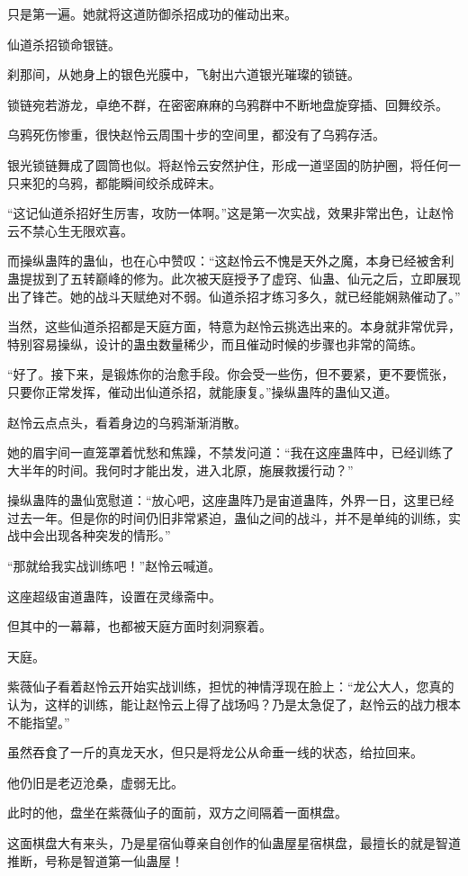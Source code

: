 \begin{this_body}
只是第一遍。她就将这道防御杀招成功的催动出来。

仙道杀招锁命银链。

刹那间，从她身上的银色光膜中，飞射出六道银光璀璨的锁链。

锁链宛若游龙，卓绝不群，在密密麻麻的乌鸦群中不断地盘旋穿插、回舞绞杀。

乌鸦死伤惨重，很快赵怜云周围十步的空间里，都没有了乌鸦存活。

银光锁链舞成了圆筒也似。将赵怜云安然护住，形成一道坚固的防护圈，将任何一只来犯的乌鸦，都能瞬间绞杀成碎末。

“这记仙道杀招好生厉害，攻防一体啊。”这是第一次实战，效果非常出色，让赵怜云不禁心生无限欢喜。

而操纵蛊阵的蛊仙，也在心中赞叹：“这赵怜云不愧是天外之魔，本身已经被舍利蛊提拔到了五转巅峰的修为。此次被天庭授予了虚窍、仙蛊、仙元之后，立即展现出了锋芒。她的战斗天赋绝对不弱。仙道杀招才练习多久，就已经能娴熟催动了。”

当然，这些仙道杀招都是天庭方面，特意为赵怜云挑选出来的。本身就非常优异，特别容易操纵，设计的蛊虫数量稀少，而且催动时候的步骤也非常的简练。

“好了。接下来，是锻炼你的治愈手段。你会受一些伤，但不要紧，更不要慌张，只要你正常发挥，催动出仙道杀招，就能康复。”操纵蛊阵的蛊仙又道。

赵怜云点点头，看着身边的乌鸦渐渐消散。

她的眉宇间一直笼罩着忧愁和焦躁，不禁发问道：“我在这座蛊阵中，已经训练了大半年的时间。我何时才能出发，进入北原，施展救援行动？”

操纵蛊阵的蛊仙宽慰道：“放心吧，这座蛊阵乃是宙道蛊阵，外界一日，这里已经过去一年。但是你的时间仍旧非常紧迫，蛊仙之间的战斗，并不是单纯的训练，实战中会出现各种突发的情形。”

“那就给我实战训练吧！”赵怜云喊道。

这座超级宙道蛊阵，设置在灵缘斋中。

但其中的一幕幕，也都被天庭方面时刻洞察着。

天庭。

紫薇仙子看着赵怜云开始实战训练，担忧的神情浮现在脸上：“龙公大人，您真的认为，这样的训练，能让赵怜云上得了战场吗？乃是太急促了，赵怜云的战力根本不能指望。”

虽然吞食了一斤的真龙天水，但只是将龙公从命垂一线的状态，给拉回来。

他仍旧是老迈沧桑，虚弱无比。

此时的他，盘坐在紫薇仙子的面前，双方之间隔着一面棋盘。

这面棋盘大有来头，乃是星宿仙尊亲自创作的仙蛊屋星宿棋盘，最擅长的就是智道推断，号称是智道第一仙蛊屋！


\end{this_body}
